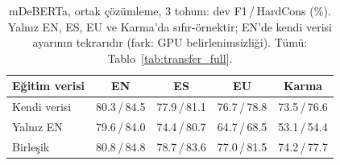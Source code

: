 \begin{table}[t]
\centering\small
\setlength{\tabcolsep}{2.5pt}
\begin{tabular}{@{}lcccc@{}}
\toprule
Eğitim verisi & EN & ES & EU & Karma \\
\midrule
Kendi verisi & 80.3\,/\,84.5 & 77.9\,/\,81.1 & 76.7\,/\,78.8 & 73.5\,/\,76.6 \\
Yalnız EN & 79.6\,/\,84.0 & 74.4\,/\,80.7 & 64.7\,/\,68.5 & 53.1\,/\,54.4 \\
Birleşik & 80.8\,/\,84.8 & 78.7\,/\,83.6 & 77.0\,/\,81.5 & 74.2\,/\,77.7 \\
\bottomrule
\end{tabular}
\caption{mDeBERTa, ortak çözümleme, 3 tohum: dev F1\,/\,HardCons (\%). Yalnız EN, ES, EU ve Karma'da sıfır-örnektir; EN'de kendi verisi ayarının tekrarıdır (fark: GPU belirlenimsizliği). Tümü: Tablo~\ref{tab:transfer_full}.}
\label{tab:transfer}
\end{table}
